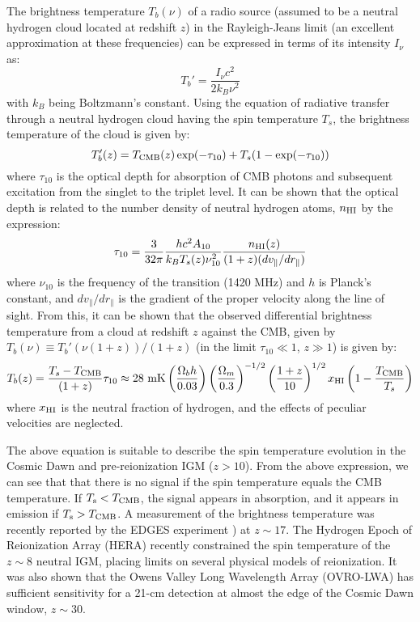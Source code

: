  The brightness temperature $T_b(\nu)$ of a radio source (assumed to be a neutral hydrogen cloud located at redshift $z$) in the Rayleigh-Jeans limit (an excellent approximation at these frequencies) can be expressed in terms of its intensity $I_{\nu}$ as:
 \begin{equation}
  T_b' = \frac{I_{\nu} c^2}{2 k_B \nu^2}
  \label{intensitytemperature}
 \end{equation} 
with $k_B$ being Boltzmann's constant. Using the equation of radiative transfer through a neutral hydrogen cloud having the spin temperature $T_s$, the brightness temperature of the cloud
is given by:
\begin{equation}
 T_b'(z) = T_{\rm CMB}(z) \exp(-\tau_{10}) + T_s (1 - \exp(-\tau_{10}))
\end{equation} 
 where $\tau_{10}$ is the optical depth for absorption of CMB photons and subsequent excitation from the singlet to the triplet level. It can be shown \cite{loeb2013, furlanettorev} that the optical depth is related to the number density of neutral hydrogen atoms,  $n_{\rm HI}$ by the expression:
 \begin{equation}
 \tau_{10} = \frac{3}{32 \pi} \frac{h c^2 A_{10}}{k_B T_s (z) \nu_{10}^2}\frac{n_{\rm HI} (z)}{(1+z) (dv_{\parallel}/dr_{\parallel})}
\end{equation} 
where $\nu_{10}$ is the frequency of the transition (1420 MHz) and $h$ is Planck's constant, and $dv_{\parallel}/dr_{\parallel}$ is the gradient of the proper velocity along the line of sight. 
From this, it can be shown \cite{loeb2013, furlanettorev} that the observed differential brightness temperature from a cloud at redshift $z$  against the CMB, given by $T_b(\nu) \equiv T_b'(\nu(1+z))/(1+z)$ (in the limit $\tau_{10} \ll 1$, $z \gg 1$) is given by:
\begin{equation}
 T_b(z)  = \frac{T_s - T_{\rm CMB}}{(1+z)} \tau_{10} \approx 28 \ {\rm{mK}} \left(\frac{\Omega_b h}{0.03}\right) \left(\frac{\Omega_m}{0.3}\right)^{-1/2} \left(\frac{1+z}{10}\right)^{1/2} x_{\rm HI} \left(1 - \frac{T_{\rm CMB}}{T_s}\right)
\end{equation} 
where $x_{\rm HI}$ is the neutral fraction of hydrogen, and the effects of peculiar velocities are neglected.

The above equation is suitable to describe the spin temperature evolution in the Cosmic Dawn and pre-reionization IGM ($z > 10$). From the above expression, we can see that that there is no signal if the spin temperature equals the CMB temperature. If $T_{\rm s} < T_{\rm CMB}$, the signal appears in absorption, and it appears in emission if $T_{\rm s} > T_{\rm CMB}$. A measurement of the brightness temperature was recently reported by the EDGES experiment \cite{bowman2018}) at $z \sim 17$. The Hydrogen Epoch of Reionization Array (HERA) recently \cite{hera2021} constrained the spin temperature of the $z \sim 8$ neutral IGM, placing limits on several physical models of reionization. It was also \cite{garsden2021} shown that the  Owens Valley Long Wavelength Array (OVRO-LWA) has sufficient sensitivity for a 21-cm detection at almost the edge of the Cosmic Dawn window, $z \sim 30$. 

